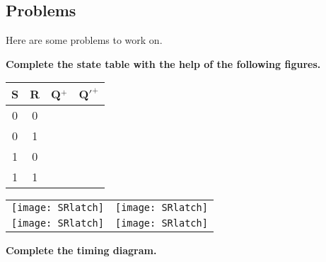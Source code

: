 


\pagebreak
\subsection{Problems}
Here are some problems to work on.

\textbf{ Complete the state table with the help of the following figures.}

\begin{tabular}{c|c||c|c}
S & R & Q$^+$ & Q$'^+$ \\ \hline
0 & 0 &  &  \\ \hline
0 & 1 &  &  \\ \hline
1 & 0 &  &  \\ \hline
1 & 1 &  &  \\
\end{tabular}

\begin{tabular}{p{2in} p{2in}}
\texttt{[image: SRlatch]} & \texttt{[image: SRlatch]} \\ 
\texttt{[image: SRlatch]} & \texttt{[image: SRlatch]} \\
\end{tabular}

\vspace{0.2in} 

\textbf{ Complete the timing diagram.}


